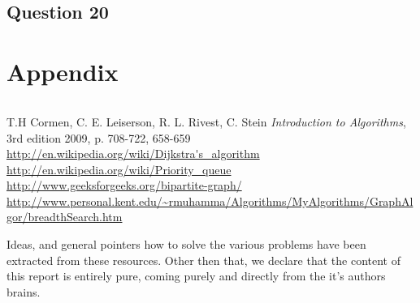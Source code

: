 \documentclass[a4paper]{article}
\begin{document}
\subsection*{Question 20}

\section{Appendix}

\begin{lstlisting}
\end{lstlisting}

\begin{thebibliography}{9}
		T.H Cormen, C. E. Leiserson, R. L. Rivest, C. Stein 	
				\textit{Introduction to Algorithms}, 3rd edition 2009, p. 708-722, 658-659 \\
		\url{http://en.wikipedia.org/wiki/Dijkstra's\_algorithm} \\
		\url{http://en.wikipedia.org/wiki/Priority\_queue} \\
		\url{http://www.geeksforgeeks.org/bipartite-graph/}
		\url{http://www.personal.kent.edu/~rmuhamma/Algorithms/MyAlgorithms/GraphAlgor/breadthSearch.htm}
\end{thebibliography}

Ideas, and general pointers how to solve the various problems have been extracted from these resources. Other then that, we declare that the content of this report is entirely pure, coming purely and directly from the it's authors brains.  
\end{document}
